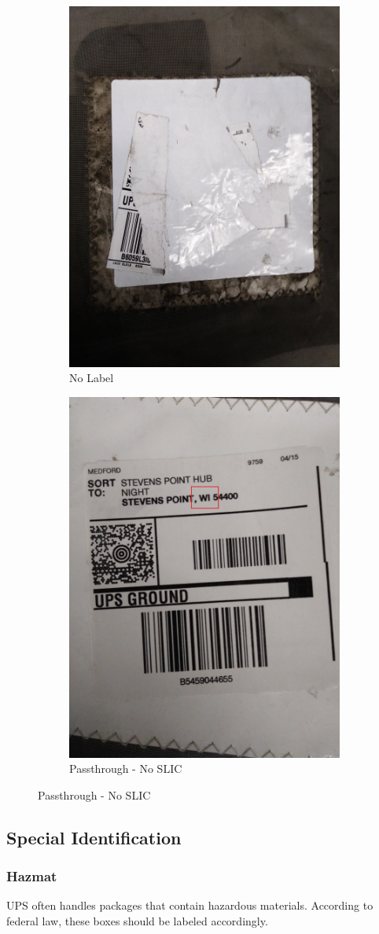 \documentclass[12pt]{article}
\begin{document}
\begin{figure}[H]
\vspace{5mm}
\begin{subfigure}{0.5\textwidth}
\centering
\includegraphics[width=0.5\linewidth]{20171221_161027}
\caption{No Label}
\end{subfigure}
\begin{subfigure}{0.5\textwidth}
\centering
\includegraphics[width=0.5\linewidth]{20171221_161718}
\caption{Passthrough - No SLIC}
\end{subfigure}
\end{figure}
\clearpage
\subsection{Special Identification}

\subsubsection{Hazmat}
UPS often handles packages that contain hazardous materials. According to federal law, these boxes should be labeled accordingly. 
\end{document}
